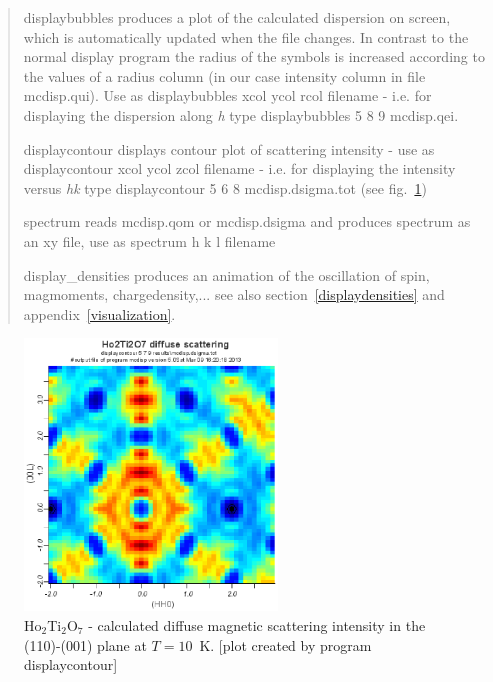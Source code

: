 \begin{quote}
\item [\prg displaybubbles\index{displaybubbles} ] produces a plot of the calculated dispersion on screen, which is 
                       automatically updated when the file changes. In contrast to the normal
		       display program the radius of the symbols is increased according to
		       the values of a radius column (in our case intensity column in file
		       mcdisp.qui). Use as {\prg displaybubbles 
		       xcol ycol rcol filename} - i.e. for displaying the dispersion along
		       {\em h} type {\prg displaybubbles  5 8 9 mcdisp.qei}. 
\item [\prg displaycontour\index{displaycontour}] displays contour plot of scattering intensity - use as
                       {\prg displaycontour xcol ycol zcol filename} - i.e. for displaying
		       the intensity versus {\em hk} type {\prg displaycontour 5 6 8 mcdisp.dsigma.tot}
		       (see fig.~\ref{ho2ti2o7diffuse})
\item [\prg spectrum]  reads mcdisp.qom or mcdisp.dsigma and produces spectrum
                       as an xy file, use as {\prg spectrum h k l filename}
\item [\prg display\_densities\index{display\_densities}] produces an animation of the 
                       oscillation of spin, magmoments, chargedensity,... see also
                       section~\ref{displaydensities} and appendix~\ref{visualization}.
\end{quote}






\begin{figure}[t]%
\begin{center}\leavevmode
\includegraphics[angle=-0, width=0.6\textwidth]{figsrc/ho2ti2o7diffuse.eps}
\end{center}
\caption{\label{ho2ti2o7diffuse}
Ho$_2$Ti$_2$O$_7$ - calculated diffuse magnetic scattering intensity in the (110)-(001)
 plane at $T=10$~K.
[plot created by program {\prg displaycontour}]
}
\end{figure}

